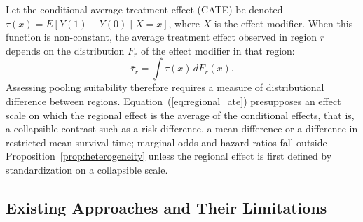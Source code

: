 \documentclass[AMA,Times1COL]{WileyNJDv5}
\begin{document}
Let the conditional average treatment effect (CATE) be denoted $\tau(x) = E[Y(1) - Y(0) \mid X = x]$, where $X$ is the effect modifier. When this function is non-constant, the average treatment effect observed in region $r$ depends on the distribution $F_r$ of the effect modifier in that region:
\begin{equation}
\bar{\tau}_r = \int \tau(x) \, dF_r(x).
\label{eq:regional_ate}
\end{equation}
Assessing pooling suitability therefore requires a measure of distributional difference between regions. Equation~(\ref{eq:regional_ate}) presupposes an effect scale on which the regional effect is the average of the conditional effects, that is, a collapsible contrast such as a risk difference, a mean difference or a difference in restricted mean survival time; marginal odds and hazard ratios fall outside Proposition~\ref{prop:heterogeneity} unless the regional effect is first defined by standardization on a collapsible scale.

\subsection{Existing Approaches and Their Limitations}\label{sec:existing}
\end{document}
